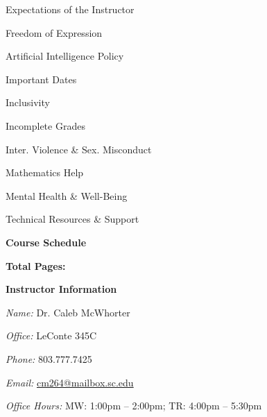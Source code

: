 \documentclass[11pt,letterpaper]{article}
\makeatletter
\newcommand{\instructor}{Dr. Caleb McWhorter}
\newcommand{\office}{LeConte 345C}
\newcommand{\phone}{803.777.7425}
\newcommand{\email}{cm264@mailbox.sc.edu}
\newcommand{\officehours}{MW: 1:00pm -- 2:00pm; TR: 4:00pm -- 5:30pm}
\makeatother
\begin{document}
\begin{minipage}[t]{0.45\textwidth}
\hspace{0.3cm} Expectations of the Instructor \dotfill \pageref{univ_instructorexp} \par
\hspace{0.3cm} Freedom of Expression \dotfill \pageref{univ_freedexpression} \par
\hspace{0.3cm} Artificial Intelligence Policy \dotfill \pageref{univ_artintel} \par
\hspace{0.3cm} Important Dates \dotfill \pageref{univ_dates} \par
\hspace{0.3cm} Inclusivity \dotfill \pageref{univ_inclusion} \par
\hspace{0.3cm} Incomplete Grades \dotfill \pageref{univ_incomplete} \par
\hspace{0.3cm} Inter. Violence \& Sex. Misconduct \dotfill \pageref{univ_viosexmis} \par
\hspace{0.3cm} Mathematics Help \dotfill \pageref{univ_mathhelp} \par
\hspace{0.3cm} Mental Health \& Well-Being \dotfill \pageref{univ_mental} \par
\hspace{0.3cm} Technical Resources \& Support \dotfill \pageref{univ_techsupport} \par
{\bfseries\color{scred} Course Schedule} \dotfill \pageref{schd} \par
\hfill {\bfseries\color{scred} Total Pages:} \pageref*{LastPage}
\end{minipage}
\pspace






\vspace{-0.2cm}  \vspace{-0.4cm}


{\bfseries\color{scred} Instructor Information} \par
\textit{Name:} \instructor \par
\textit{Office:} \office \par
\textit{Phone:} \phone \par
\textit{Email:} \href{mailto:\email}{\email} \par
\textit{Office Hours:} \officehours 
\pvspace{0.1cm}
\end{document}
